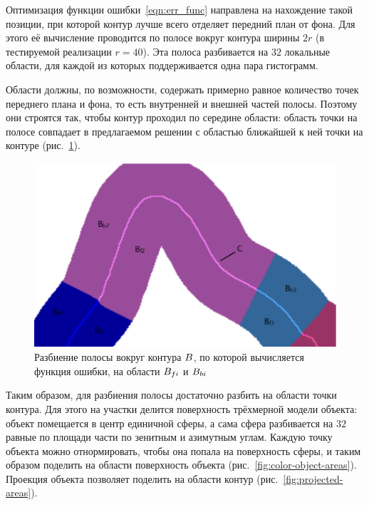 Оптимизация функции ошибки~\ref{eqn:err_func} направлена на нахождение такой
позиции, при которой контур лучше всего отделяет передний план от фона.
Для этого её вычисление проводится по полосе вокруг контура ширины $2r$ (в
тестируемой реализации $r = 40$).
Эта полоса разбивается на $32$ локальные области, для каждой из
которых поддерживается одна пара гистограмм.

Области должны, по возможности, содержать примерно равное количество точек
переднего плана и фона, то есть внутренней и внешней частей полосы.
Поэтому они строятся так, чтобы контур проходил по середине области: область
точки на полосе совпадает в предлагаемом решении с областью ближайшей
к ней точки на контуре (рис.~\ref{fig:fb_contour}).

\begin{figure}[t]
    \centering
    \includegraphics[width=\textwidth]{fig/fb_contour.png}
    \caption{
        Разбиение полосы вокруг контура $B$, по которой вычисляется
        функция ошибки, на области $B_{fi}$ и $B_{bi}$
    }
    \label{fig:fb_contour}
\end{figure}

Таким образом, для разбиения полосы достаточно разбить на области точки контура.
Для этого на участки делится поверхность трёхмерной модели объекта: объект
помещается в центр единичной сферы, а сама сфера разбивается на $32$ равные по
площади части по зенитным и азимутным углам.
Каждую точку объекта можно отнормировать, чтобы она попала на поверхность
сферы, и таким образом поделить на области поверхность объекта
(рис.~\ref{fig:color-object-areas}).
Проекция объекта позволяет поделить на области контур
(рис.~\ref{fig:projected-areas}).

